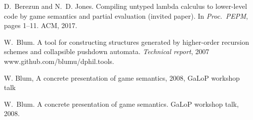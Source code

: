 \documentclass[xchauthor,chkrefs,GCNS,amsmath,amsthm,rotating,leaveRGB]{tcsg}
\theoremstyle{plain}
\theoremstyle{definition}
\begin{document}
\begin{backmatter}
\begin{thebibliography}{}
\begin{bsubitem}
\begin{bcontribution}%
\end{bcontribution}
\begin{bhost}
\begin{beditedbook}
\end{beditedbook}
\end{bhost}
\end{bsubitem}
%
\OrigBibText
D.~Berezun and N.~D. Jones.
 Compiling untyped lambda calculus to lower-level code by game
 semantics and partial evaluation (invited paper).
 In \emph{Proc.\ PEPM}, pages 1--11. ACM, 2017.
\endOrigBibText
{}%
\endbibitem

\begin{bsubitem}
\begin{bcontribution}%
\end{bcontribution}
\prnsep{,\ }
\begin{bhost}
\begin{bbook}[class=report]
\end{bbook}
\end{bhost}
\begin{bhost}
\begin{behost}
\end{behost}
\end{bhost}
\end{bsubitem}
%
\OrigBibText
W.~Blum.
 A tool for constructing structures generated by higher-order
 recursion schemes and collapsible pushdown automata.
 \emph{Technical report}, 2007 www.github.com/blumu/dphil.tools.
\endOrigBibText
{}%
\endbibitem

\begin{botherref}
W. Blum,
A concrete presentation of game semantics,
2008,
Ga{L}o{P} workshop talk
\end{botherref}
%
\OrigBibText
W.~Blum.
 A concrete presentation of game semantics.
 Ga{L}o{P} workshop talk, 2008.
\endOrigBibText
{}%
\endbibitem


\end{thebibliography}
\end{backmatter}
\end{document}
